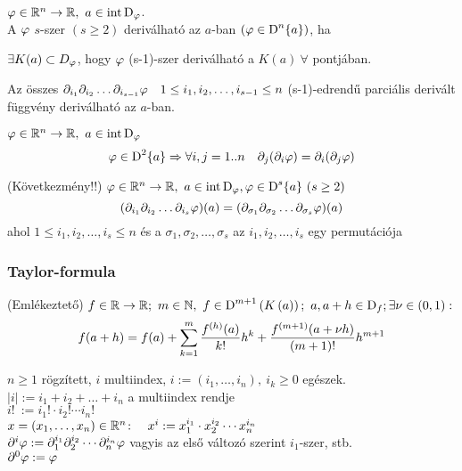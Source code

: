 \begin{de}
  $\vfi \in\RnR,\ a\in\intD_\vfi$. \\A $\varphi$ $s$-szer $(s\geq2)$ deriválható az $a$-ban $(\varphi \in\operatorname{D}^{n}\{a\})$, ha
    \begin{enumzjr}
    \item $\exists K(a)\subset D_\varphi$, hogy $\varphi$ (s-1)-szer deriválható a $K(a)\ \forall$ pontjában.
    \item Az összes $\partial_{i_1}\partial_{i_2}\ldots\partial_{i_{s-1}}\varphi\quad 1\leq i_1, i_2,\dotsc,i_{s-1} \leq n$
      \quad (s-1)-edrendű parciális derivált függvény deriválható az $a$-ban.
    \end{enumzjr}
\end{de}
\begin{te}$\vfi\in\RnR,\ a\in\intD_\vfi$
  \[\varphi \in\operatorname{D}^{2}\{a\}\Rightarrow\forall i,j=1..n\quad \partial_j(\partial_i\varphi) = \partial_i(\partial_j\varphi) \]
\end{te}
\begin{te}\label{te:youngkov}(Következmény!!) $\varphi\in\mathbb{R}^n\to\mathbb{R},\ a\in\operatorname{int\,D}_\varphi, \varphi\in\operatorname{D}^{s}\{a\}\ (s\geq2)$
  \[ (\partial_{i_1}\partial_{i_2}\ldots\partial_{i_s}\varphi)(a) = 
  (\partial_{\sigma_1}\partial_{\sigma_2}\ldots\partial_{\sigma_s}\varphi)(a)\]
  ahol $1\leq i_1, i_2,\dotsc,i_s \leq n$ és a $\sigma_1, \sigma_2,\dotsc,\sigma_s$ az $i_1, i_2,\dotsc,i_s$ egy
  permutációja  
\end{te}

\subsubsection{Taylor-formula}
\begin{te}(Emlékeztető)
  $f\in\R\n\R;\ m\in\N,\ f\in\D^{m+1}\left(K\left(a\right)\right);\ a,a+h\in\D_f;\\\exists \nu\in(0,1):$
  \[\displaystyle f(a+h) = f(a) + \sum_{k=1}^m\dfrac{f^{(h)}(a)}{k!}h^k + \dfrac{f^{(m+1)}(a+\nu h)}{(m+1)!}h^{m+1}\]  
\end{te}

\begin{de}[Multiindex] $n\geq 1$ rögzített, $i$ multiindex, $i:=(i_1,\dotsc,i_n),\ i_k\geq 0$ egészek.\\
  $|i| := i_1 + i_2 + \ldots + i_n$ a multiindex rendje\\
  $i!~ := i_1! \cdot i_2! \dotsm i_n!$\\
  $x=(x_1,\dotsc,x_n)\in\mathbb{R}^n\colon\quad x^i := x_1^{i_1}\cdot x_2^{i_2}\dotsm x_n^{i_n}$\\
  $\partial^i\varphi := \partial_1^{i_1}\partial_2^{i_2}\dotsb\partial_n^{i_n}\varphi$ vagyis az első változó szerint
  $i_1$-szer, stb.\\
  $\partial^0\varphi :=  \varphi$
\end{de}

